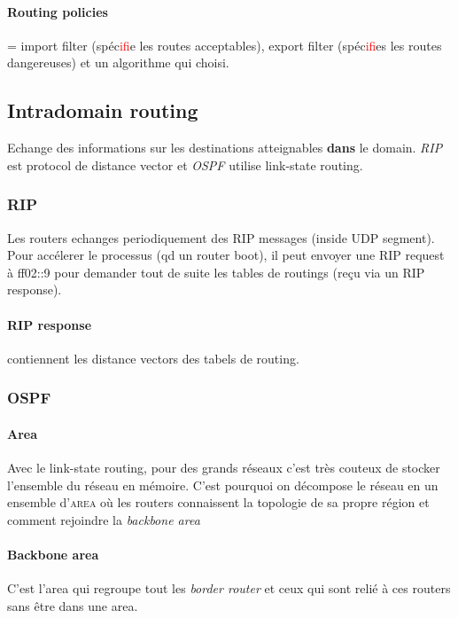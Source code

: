 \paragraph{Routing  policies}  =  import filter  (spéc\textcolor{red}{if}ie  les  routes
acceptables), export  filter (spéc\textcolor{red}{if}ies  les routes dangereuses)  et un
algorithme qui choisi.


\subsection{Intradomain routing}
Echange des informations sur les destinations atteignables \textbf{dans} le domain.
\textit{RIP} est protocol de distance vector et \textit{OSPF} utilise link-state routing.

\subsubsection{RIP}
Les routers echanges periodiquement des RIP messages (inside UDP segment).
Pour accélerer le processus (qd un router boot), il peut envoyer une RIP request à ff02::9
pour demander tout de suite les tables de routings (reçu via un RIP response).

\paragraph{RIP response} contiennent les distance vectors des tabels de routing.

\subsubsection{OSPF}

\paragraph{Area}
Avec le link-state routing, pour des grands réseaux c'est très couteux de stocker
l'ensemble du réseau en mémoire. C'est pourquoi on décompose le réseau en un
ensemble d'\textsc{area} où les routers connaissent la topologie de sa propre
région et comment rejoindre la \textit{backbone area}

\paragraph{Backbone area}
C'est l'area qui regroupe tout les \textit{border router} et ceux qui sont relié
à ces routers sans être dans une area.

